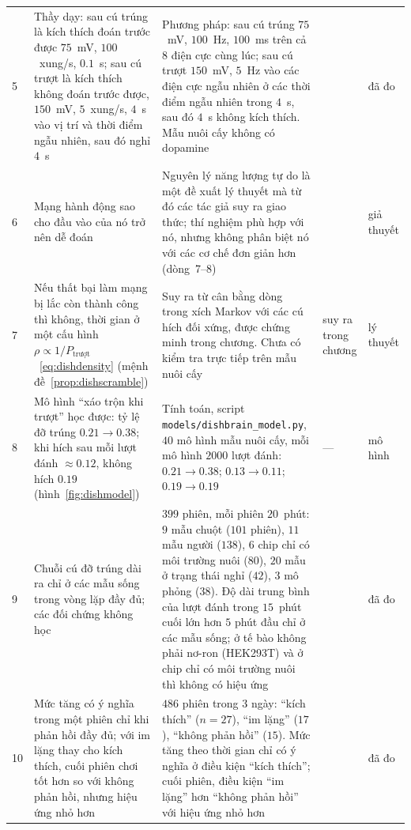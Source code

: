 {\begin{longtable}{>{\raggedright}p{0.5cm}>{\raggedright}p{4.0cm}>{\raggedright}p{5.6cm}>{\raggedright}p{2.3cm}>{\raggedright\arraybackslash}p{1.7cm}}
5 & Thầy dạy: sau cú trúng là kích thích đoán trước được $75$~mV, $100$~xung/s, $0.1$~s; sau cú trượt là kích thích không đoán trước được, $150$~mV, $5$~xung/s, $4$~s vào vị trí và thời điểm ngẫu nhiên, sau đó nghỉ $4$~s & Phương pháp: sau cú trúng $75$~mV, $100$~Hz, $100$~ms trên cả $8$ điện cực cùng lúc; sau cú trượt $150$~mV, $5$~Hz vào các điện cực ngẫu nhiên ở các thời điểm ngẫu nhiên trong $4$~s, sau đó $4$~s không kích thích. Mẫu nuôi cấy không có dopamine & \cite{Kagan2022} & đã đo \\
6 & Mạng hành động sao cho đầu vào của nó trở nên dễ đoán & Nguyên lý năng lượng tự do là một đề xuất lý thuyết mà từ đó các tác giả suy ra giao thức; thí nghiệm phù hợp với nó, nhưng không phân biệt nó với các cơ chế đơn giản hơn (dòng~7--8) & \cite{Friston2010,Kagan2022} & giả thuyết \\
7 & Nếu thất bại làm mạng bị lắc còn thành công thì không, thời gian ở một cấu hình $\rho\propto1/P_{\text{trượt}}$~\eqref{eq:dishdensity} (mệnh đề~\ref{prop:dishscramble}) & Suy ra từ cân bằng dòng trong xích Markov với các cú hích đối xứng, được chứng minh trong chương. Chưa có kiểm tra trực tiếp trên mẫu nuôi cấy & suy ra trong chương & lý thuyết \\
8 & Mô hình ``xáo trộn khi trượt'' học được: tỷ lệ đỡ trúng $0.21\to0.38$; khi hích sau mỗi lượt đánh $\approx0.12$, không hích $0.19$ (hình~\ref{fig:dishmodel}) & Tính toán, script \texttt{models/dishbrain\_model.py}, $40$ mô hình mẫu nuôi cấy, mỗi mô hình $2000$ lượt đánh: $0.21\to0.38$; $0.13\to0.11$; $0.19\to0.19$ & --- & mô hình \\
9 & Chuỗi cú đỡ trúng dài ra chỉ ở các mẫu sống trong vòng lặp đầy đủ; các đối chứng không học & $399$ phiên, mỗi phiên $20$~phút: $9$ mẫu chuột ($101$ phiên), $11$ mẫu người ($138$), $6$ chip chỉ có môi trường nuôi ($80$), $20$ mẫu ở trạng thái nghỉ ($42$), $3$ mô phỏng ($38$). Độ dài trung bình của lượt đánh trong $15$~phút cuối lớn hơn $5$ phút đầu chỉ ở các mẫu sống; ở tế bào không phải nơ-ron (HEK293T) và ở chip chỉ có môi trường nuôi thì không có hiệu ứng & \cite{Kagan2022} & đã đo \\
10 & Mức tăng có ý nghĩa trong một phiên chỉ khi phản hồi đầy đủ; với im lặng thay cho kích thích, cuối phiên chơi tốt hơn so với không phản hồi, nhưng hiệu ứng nhỏ hơn & $486$ phiên trong $3$ ngày: ``kích thích'' ($n=27$), ``im lặng'' ($17$), ``không phản hồi'' ($15$). Mức tăng theo thời gian chỉ có ý nghĩa ở điều kiện ``kích thích''; cuối phiên, điều kiện ``im lặng'' hơn ``không phản hồi'' với hiệu ứng nhỏ hơn & \cite{Kagan2022} & đã đo \\

\end{longtable}}
